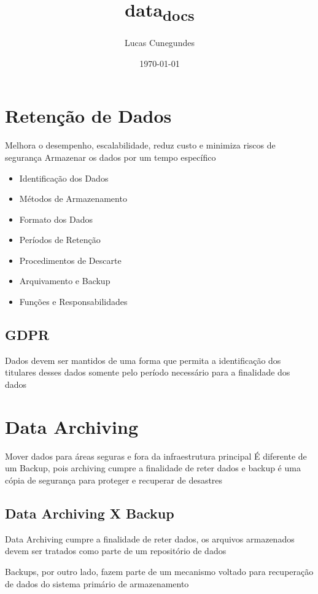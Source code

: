\documentclass[11pt]{article}
\author{Lucas Cunegundes}
\date{\today}
\title{data\textsubscript{docs}}
\begin{document}
\maketitle
\tableofcontents

\section{Retenção de Dados}
\label{sec:org7a7a77c}

Melhora o desempenho, escalabilidade, reduz custo e minimiza riscos de segurança
Armazenar os dados por um tempo específico

\begin{itemize}
\item Identificação dos Dados
\item Métodos de Armazenamento
\item Formato dos Dados
\item Períodos de Retenção
\item Procedimentos de Descarte
\item Arquivamento e Backup
\item Funções e Responsabilidades
\end{itemize}
\subsection{GDPR}
\label{sec:org59fd872}

Dados devem ser mantidos de uma forma que permita a identificação dos titulares
desses dados somente pelo período necessário para a finalidade dos dados
\section{Data Archiving}
\label{sec:orgfc72a57}

Mover dados para áreas seguras e fora da infraestrutura principal
É diferente de um Backup, pois archiving cumpre a finalidade de reter dados e backup é uma cópia de segurança
para proteger e recuperar de desastres
\subsection{Data Archiving X Backup}
\label{sec:org205db19}

Data Archiving cumpre a finalidade de reter dados, os arquivos armazenados devem ser tratados
como parte de um repositório de dados

Backups, por outro lado, fazem parte de um mecanismo voltado para recuperação de dados do sistema
primário de armazenamento
\end{document}
